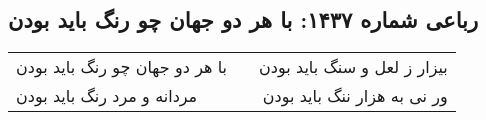 \begin{center}
\section*{رباعی شماره ۱۴۳۷: با هر دو جهان چو رنگ باید بودن}
\label{sec:1437}
\begin{longtable}{l p{0.5cm} r}
با هر دو جهان چو رنگ باید بودن
&&
بیزار ز لعل و سنگ باید بودن
\\
مردانه و مرد رنگ باید بودن
&&
ور نی به هزار ننگ باید بودن
\\
\end{longtable}
\end{center}
